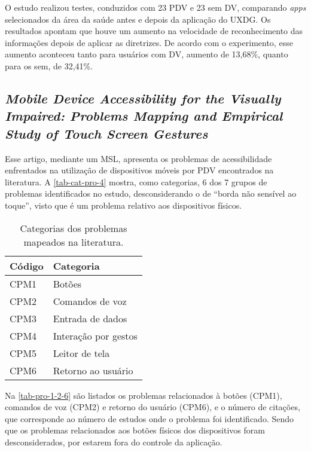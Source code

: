 O estudo realizou testes, conduzidos com 23 PDV e 23 sem DV, comparando \emph{apps} selecionados da área da saúde antes e depois da aplicação do UXDG\@.
Os resultados apontam que houve um aumento na velocidade de reconhecimento das informações depois de aplicar as diretrizes.
De acordo com o experimento, esse aumento aconteceu tanto para usuários com DV, aumento de 13,68\%, quanto para os sem, de 32,41\%.

\subsection{\emph{Mobile Device Accessibility for the Visually Impaired: Problems Mapping and Empirical Study of Touch Screen Gestures}}

Esse artigo, mediante um MSL, apresenta os problemas de acessibilidade enfrentados na utilização de dispositivos móveis por PDV encontrados na literatura.
A \autoref{tab-cat-pro-4} mostra, como categorias, 6 dos 7 grupos de problemas identificados no estudo,
desconsiderando o de ``borda não sensível ao toque'', visto que é um problema relativo aos dispositivos físicos.

\begin{table}[htb]
  \begin{center}
    \ABNTEXfontereduzida
    \caption{Categorias dos problemas mapeados na literatura.}
    \label{tab-cat-pro-4}
    \begin{tabular}{p{2.0cm}|p{5.0cm}}
      \textbf{Código} & \textbf{Categoria}   \\
      \hline
      CPM1            & Botões               \\
      \hline
      CPM2            & Comandos de voz      \\
      \hline
      CPM3            & Entrada de dados     \\
      \hline
      CPM4            & Interação por gestos \\
      \hline
      CPM5            & Leitor de tela       \\
      \hline
      CPM6            & Retorno ao usuário   \\
    \end{tabular}
  \end{center}
\end{table}

Na \autoref{tab-pro-1-2-6} são listados os problemas relacionados à botões (CPM1), comandos de voz (CPM2) e retorno do usuário (CPM6), e o número de citações, que corresponde ao número de estudos
onde o problema foi identificado. Sendo que os problemas relacionados aos botões físicos dos dispositivos foram desconsiderados, por estarem fora do controle da aplicação.

